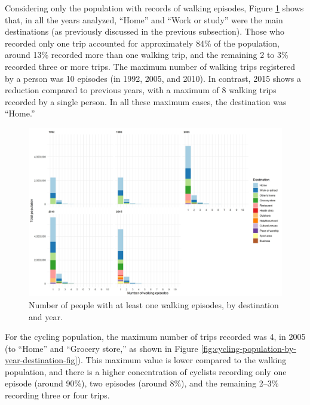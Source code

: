 \documentclass[preprint, 3p,
authoryear]{elsarticle} %
\begin{document}
Considering only the population with records of walking episodes, Figure
\ref{fig:walking-population-by-year-destination-fig} shows that, in all
the years analyzed, ``Home'' and ``Work or study'' were the main
destinations (as previously discussed in the previous subsection). Those
who recorded only one trip accounted for approximately 84\% of the
population, around 13\% recorded more than one walking trip, and the
remaining 2 to 3\% recorded three or more trips. The maximum number of
walking trips registered by a person was 10 episodes (in 1992, 2005, and
2010). In contrast, 2015 shows a reduction compared to previous years,
with a maximum of 8 walking trips recorded by a single person. In all
these maximum cases, the destination was ``Home.''

\begin{figure}

{\centering \includegraphics[width=1\linewidth]{figures/people_per_ep_walking} 

}

\caption{Number of people with at least one walking episodes, by destination and year.}\label{fig:walking-population-by-year-destination-fig}
\end{figure}

For the cycling population, the maximum number of trips recorded was 4,
in 2005 (to ``Home'' and ``Grocery store,'' as shown in Figure
\ref{fig:cycling-population-by-year-destination-fig}). This maximum
value is lower compared to the walking population, and there is a higher
concentration of cyclists recording only one episode (around 90\%), two
episodes (around 8\%), and the remaining 2--3\% recording three or four
trips.
\end{document}
